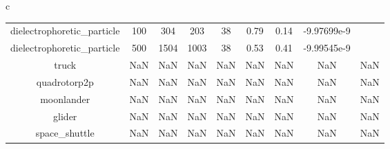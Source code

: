 \documentclass{standalone}
\begin{document}
\begin{tabular}{c}
\begin{tabular}{ccccccccc}
  dielectrophoretic\_particle & 100 & 304 & 203 & 38 & 0.79 & 0.14 & -9.97699e-9 & \color{red}{Infeasible Problem} \\
  dielectrophoretic\_particle & 500 & 1504 & 1003 & 38 & 0.53 & 0.41 & -9.99545e-9 & \color{red}{Infeasible Problem} \\
  truck & NaN & NaN & NaN & NaN & NaN & NaN & NaN & NaN \\
  quadrotorp2p & NaN & NaN & NaN & NaN & NaN & NaN & NaN & NaN \\
  moonlander & NaN & NaN & NaN & NaN & NaN & NaN & NaN & NaN \\
  glider & NaN & NaN & NaN & NaN & NaN & NaN & NaN & NaN \\
  space\_shuttle & NaN & NaN & NaN & NaN & NaN & NaN & NaN & NaN \\\hline
\end{tabular}
\end{tabular}
\end{document}
